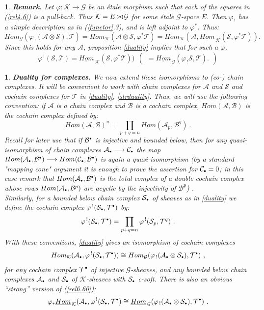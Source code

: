 \documentclass[a4paper]{article}
\newtheorem{num}[st]{}
\newcommand{\ii}{\ensuremath{\mathcal{T}}}
\newcommand{\f}{\ensuremath{\varphi}}
\newcommand{\rmap}{\longrightarrow}
\newcommand{\Ka}{\ensuremath{\mathcal{K}}}
\newcommand{\G}{\ensuremath{\mathcal{G}}}
\newcommand{\A}{\ensuremath{\mathcal{A}}}
\newcommand{\es}{\ensuremath{\mathcal{S}}}
\newcommand{\B}{\ensuremath{\mathcal{B}}}
\newcommand{\C}{\ensuremath{\mathcal{C}}}
\def\cross{\mathinner{\mathrel{\raise0.8pt\hbox{$\scriptstyle>$}}
                 \joinrel\mathrel\triangleleft}}
\def\cdot{{\raise 0.5pt\hbox{$\scriptscriptstyle\bullet$}}}
\begin{document}
\begin{num}
\emph{
{\bf Remark.} Let $\f :\Ka \rmap \G$ be an \'etale morphism such that each of the squares in (\ref{rel4.6})  is a pull-back. Thus $\Ka = E\cross\G$ for some \'etale $\G$-space $E$. Then $\f_{\, !}$ has a simple description as in (\ref{functor}.3), and is left adjoint to $\f^{*}$. Thus:
\[ Hom_{\G}(\f_{\, !}(\A \otimes \es), \ii) = Hom_{\Ka}(\A \otimes \es, \f^{*}\ii) = Hom_{\Ka}(\A, \underline{Hom}_{\, \Ka}(\es, \f^{*}\ii)).\]
Since this holds for any $\A$, proposition \ref{duality} implies that for such a $\f$,
\[ \f^{\, !}(\es, \ii) = \underline{Hom}_{\, \Ka}(\es, \f^{*}\ii)) \ \ (\ \  = \underline{Hom}_{\, \G}(\f_{\, !}\es, \ii).\  \ ) \] 
}
\end{num}






\begin{num}
\label{ducompl}
\emph{
{\bf Duality for complexes.} We now extend these isomorphisms to (co-) chain complexes. It will be convenient to work with {\it chain} complexes for $\A$ and $\es$ and {\it cochain} complexes for $\ii$ in \ref{duality}, \ref{strduality}. Thus, we will use the following convention: if $\A$ is a chain complex and $\B$ is a cochain complex, $Hom(\A, \B)$ is the {\it cochain} complex defined by:
\[ Hom(\A, \B)^{n} = \prod_{p+q= n} Hom(\A_{p}, \B^{q})\ .\]
\hspace*{.3in} Recall for later use that if $\B^{\cdot}$ is injective and bounded below, then for any quasi-isomorphism of chain complexes $\A_{\cdot} \rmap \C_{\cdot}$ the map $Hom(\A_{\cdot}, \B^{\cdot}) \rmap Hom(\C_{\cdot}, \B^{\cdot})$ is again a quasi-isomorphism (by a standard "mapping cone" argument it is enough to prove the assertion for $\C_{\cdot}= 0$; in this case remark that $Hom(\A_{\cdot}, \B^{\cdot})$ is the total complex of a double cochain complex whose rows $Hom(\A_{\cdot}, \B^{p})$ are acyclic by the injectivity of $\B^{p}$) .\\
\hspace*{.3in} Similarly, for a bounded below chain complex $\es_{\cdot}$ of sheaves as in \ref{duality} we define the cochain complex $\f^{\, !}(\es_{\cdot}, \ii^{\cdot})$ by:
\[ \f^{\, !}(\es_{\cdot}, \ii^{\cdot}) = \prod_{p+q= n} \f^{\, !}(\es_{p}, \ii^{q})\ .\]
\hspace*{.3in} With these conventions, \ref{duality} gives an isomorphism of cochain complexes
\begin{equation}
\label{rel6.60}
 Hom_{\Ka}(\A_{\cdot}, \f^{\, !}(\es_{\cdot}, \ii^{\cdot})) \cong Hom_{\G}(\f_{\, !}(\A_{\cdot}\otimes \es_{\cdot}), \ii^{\cdot})\ ,
\end{equation}
for any cochain complex $\ii^{\cdot}$ of injective $\G$-sheaves, and any bounded below chain complexes $\A_{\cdot}$ and $\es_{\cdot}$ of $\Ka$-sheaves with $\es_{\cdot}$ c-soft. There is also an obvious ``strong'' version of (\ref{rel6.60}):
\[ \f_{*} \underline{Hom}_{\, \Ka}(\A_{\cdot}, \f^{\, !}(\es_{\cdot}, \ii^{\cdot}) \cong \underline{Hom}_{\, \G}(\f_{\, !}(\A_{\cdot}\otimes \es_{\cdot}), \ii^{\cdot})\ .\]
}
\end{num}
\end{document}
